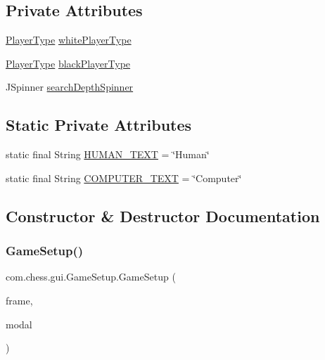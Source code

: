 \subsection*{Private Attributes}
\begin{DoxyCompactItemize}
\item 
\mbox{\hyperlink{enumcom_1_1chess_1_1gui_1_1_table_1_1_player_type}{Player\+Type}} \mbox{\hyperlink{classcom_1_1chess_1_1gui_1_1_game_setup_af788c7bfbd55522bb4e98609ede0e695}{white\+Player\+Type}}
\item 
\mbox{\hyperlink{enumcom_1_1chess_1_1gui_1_1_table_1_1_player_type}{Player\+Type}} \mbox{\hyperlink{classcom_1_1chess_1_1gui_1_1_game_setup_afca51706d18e41dcafbf22fa43c393c8}{black\+Player\+Type}}
\item 
J\+Spinner \mbox{\hyperlink{classcom_1_1chess_1_1gui_1_1_game_setup_a11793a6ff225429e99f87fd9fc507e0c}{search\+Depth\+Spinner}}
\end{DoxyCompactItemize}
\subsection*{Static Private Attributes}
\begin{DoxyCompactItemize}
\item 
static final String \mbox{\hyperlink{classcom_1_1chess_1_1gui_1_1_game_setup_a4244024fd6921dea9c886d40f0012059}{H\+U\+M\+A\+N\+\_\+\+T\+E\+XT}} = \char`\"{}Human\char`\"{}
\item 
static final String \mbox{\hyperlink{classcom_1_1chess_1_1gui_1_1_game_setup_a9bc40c2f94bebd791b48a0cb081d190b}{C\+O\+M\+P\+U\+T\+E\+R\+\_\+\+T\+E\+XT}} = \char`\"{}Computer\char`\"{}
\end{DoxyCompactItemize}


\subsection{Constructor \& Destructor Documentation}
\mbox{\label{classcom_1_1chess_1_1gui_1_1_game_setup_adc584784b97f7f921bbed681891ab10e}} 
\subsubsection{\texorpdfstring{GameSetup()}{GameSetup()}}
{\footnotesize\ttfamily com.\+chess.\+gui.\+Game\+Setup.\+Game\+Setup (\begin{DoxyParamCaption}\item[{final J\+Frame}]{frame,  }\item[{final boolean}]{modal }\end{DoxyParamCaption})\hspace{0.3cm}{\ttfamily [package]}}



